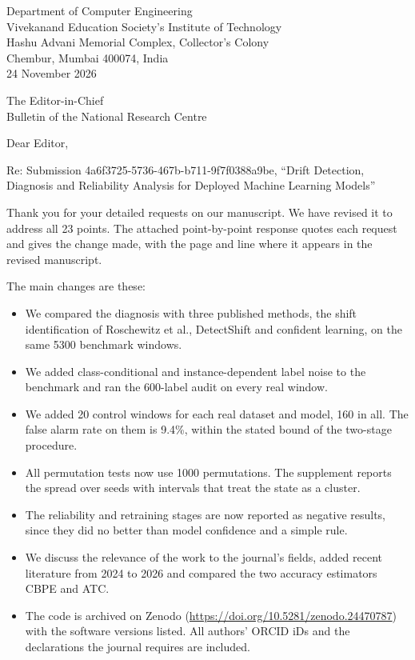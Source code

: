 \documentclass[11pt,a4paper]{article}
\begin{document}
\begin{flushright}
Department of Computer Engineering\\
Vivekanand Education Society's Institute of Technology\\
Hashu Advani Memorial Complex, Collector's Colony\\
Chembur, Mumbai 400074, India\\[6pt]
24 November 2026
\end{flushright}

The Editor-in-Chief\\
Bulletin of the National Research Centre

Dear Editor,

Re: Submission 4a6f3725-5736-467b-b711-9f7f0388a9be, ``Drift Detection, Diagnosis and Reliability Analysis for Deployed Machine Learning Models''

Thank you for your detailed requests on our manuscript. We have revised it to address all 23 points. The attached point-by-point response quotes each request and gives the change made, with the page and line where it appears in the revised manuscript.

The main changes are these:
\begin{itemize}
\item We compared the diagnosis with three published methods, the shift identification of Roschewitz et al., DetectShift and confident learning, on the same 5300 benchmark windows.
\item We added class-conditional and instance-dependent label noise to the benchmark and ran the 600-label audit on every real window.
\item We added 20 control windows for each real dataset and model, 160 in all. The false alarm rate on them is 9.4\%, within the stated bound of the two-stage procedure.
\item All permutation tests now use 1000 permutations. The supplement reports the spread over seeds with intervals that treat the state as a cluster.
\item The reliability and retraining stages are now reported as negative results, since they did no better than model confidence and a simple rule.
\item We discuss the relevance of the work to the journal's fields, added recent literature from 2024 to 2026 and compared the two accuracy estimators CBPE and ATC.
\item The code is archived on Zenodo (\url{https://doi.org/10.5281/zenodo.24470787}) with the software versions listed. All authors' ORCID iDs and the declarations the journal requires are included.
\end{itemize}
\end{document}
